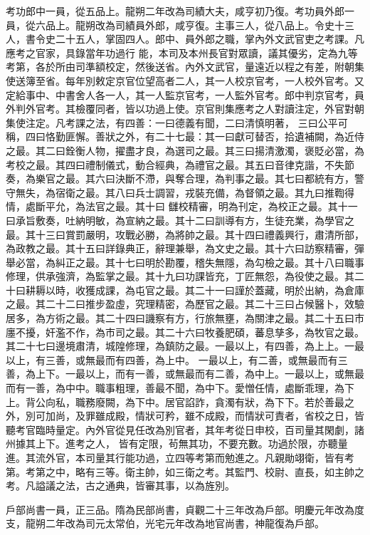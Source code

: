 \begin{pinyinscope}
 考功郎中一員，從五品上。龍朔二年改為司績大夫，咸亨初乃復。考功員外郎一員，從六品上。龍朔改為司績員外郎，咸亨復。主事三人，從八品上。令史十三人，書令史二十五人，掌固四人。郎中、員外郎之職，掌內外文武官吏之考課。凡應考之官家，具錄當年功過行
 能，本司及本州長官對眾讀，議其優劣，定為九等考第，各於所由司準額校定，然後送省。內外文武官，量遠近以程之有差，附朝集使送簿至省。每年別敕定京官位望高者二人，其一人校京官考，一人校外官考。又定給事中、中書舍人各一人，其一人監京官考，一人監外官考。郎中判京官考，員外判外官考。其檢覆同者，皆以功過上使。京官則集應考之人對讀注定，外官對朝集使注定。凡考課之法，有四善：一曰德義有聞，二曰清慎明著，
 三曰公平可稱，四曰恪勤匪懈。善狀之外，有二十七最：其一曰獻可替否，拾遺補闕，為近侍之最。其二曰銓衡人物，擢盡才良，為選司之最。其三曰揚清激濁，褒貶必當，為考校之最。其四曰禮制儀式，動合經典，為禮官之最。其五曰音律克諧，不失節奏，為樂官之最。其六曰決斷不滯，與奪合理，為判事之最。其七曰都統有方，警守無失，為宿衛之最。其八曰兵士調習，戎裝充備，為督領之最。其九曰推鞫得情，處斷平允，為法官之最。其十曰
 讎校精審，明為刊定，為校正之最。其十一曰承旨敷奏，吐納明敏，為宣納之最。其十二曰訓導有方，生徒充業，為學官之最。其十三曰賞罰嚴明，攻戰必勝，為將帥之最。其十四曰禮義興行，肅清所部，為政教之最。其十五曰詳錄典正，辭理兼舉，為文史之最。其十六曰訪察精審，彈舉必當，為糾正之最。其十七曰明於勘覆，稽失無隱，為勾檢之最。其十八曰職事修理，供承強濟，為監掌之最。其十九曰功課皆充，丁匠無怨，為役使之最。其二
 十曰耕耨以時，收獲成課，為屯官之最。其二十一曰謹於蓋藏，明於出納，為倉庫之最。其二十二曰推步盈虛，究理精密，為歷官之最。其二十三曰占候醫卜，效驗居多，為方術之最。其二十四曰譏察有方，行旅無壅，為關津之最。其二十五曰市廛不擾，奸濫不作，為市司之最。其二十六曰牧養肥碩，蕃息孳多，為牧官之最。其二十七曰邊境肅清，城隍修理，為鎮防之最。一最以上，有四善，為上上。一最以上，有三善，或無最而有四善，為上中。
 一最以上，有二善，或無最而有三善，為上下。一最以上，而有一善，或無最而有二善，為中上。一最以上，或無最而有一善，為中中。職事粗理，善最不聞，為中下。愛憎任情，處斷乖理，為下上。背公向私，職務廢闕，為下中。居官諂詐，貪濁有狀，為下下。若於善最之外，別可加尚，及罪雖成殿，情狀可矜，雖不成殿，而情狀可責者，省校之日，皆聽考官臨時量定。內外官從見任改為別官者，其年考從日申校，百司量其閑劇，諸州據其上下。進考之人，
 皆有定限，茍無其功，不要充數。功過於限，亦聽量進。其流外官，本司量其行能功過，立四等考第而勉進之。凡親勛翊衛，皆有考第。考第之中，略有三等。衛主帥，如三衛之考。其監門、校尉、直長，如主帥之考。凡謚議之法，古之通典，皆審其事，以為旌別。



 戶部尚書一員，正三品。隋為民部尚書，貞觀二十三年改為戶部。明慶元年改為度支，龍朔二年改為司元太常伯，光宅元年改為地官尚書，神龍復為戶部。




\end{pinyinscope}

